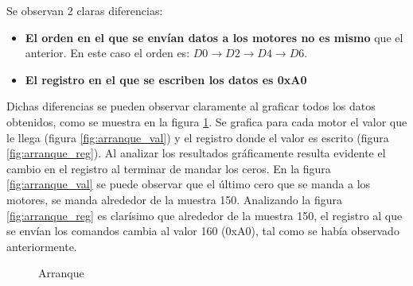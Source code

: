 \documentclass[main]{subfiles}
\begin{document}
Se observan 2 claras diferencias:
\begin{itemize}
\item \textbf{El orden en el que se env\'ian datos a los motores no es mismo} que el anterior. En este caso el orden es: $D0\rightarrow D2\rightarrow D4\rightarrow D6$.
\item \textbf{El registro en el que se escriben los datos es 0xA0}
\end{itemize}

Dichas diferencias se pueden observar claramente al graficar todos los datos obtenidos, como se muestra en la figura \ref{fig:arranque}. Se grafica para cada motor el valor que le llega (figura \ref{fig:arranque_val}) y el registro donde el valor es escrito (figura \ref{fig:arranque_reg}). Al analizar los resultados gr\'aficamente resulta evidente el cambio en el registro al terminar de mandar los ceros. En la figura \ref{fig:arranque_val} se puede observar que el \'ultimo cero que se manda a los motores, se manda alrededor de la muestra 150. Analizando la figura \ref{fig:arranque_reg} es clar\'isimo que alrededor de la muestra 150, el registro al que se env\'ian los comandos cambia al valor 160 (0xA0), tal como se hab\'ia observado anteriormente.

\begin{figure} [h!]
\centering
  \caption{Arranque}
  \label{fig:arranque}
\end{figure}
\end{document}
